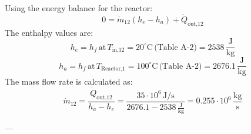 Using the energy balance for the reactor:  
\[
0 = \dot{m}_{12} (h_e - h_a) + \dot{Q}_{\text{out,12}}
\]  
The enthalpy values are:  
\[
h_e = h_f \, \text{at} \, T_{\text{in,12}} = 20^\circ\text{C} \, \text{(Table A-2)} = 2538 \, \frac{\text{J}}{\text{kg}}
\]  
\[
h_a = h_f \, \text{at} \, T_{\text{Reactor,1}} = 100^\circ\text{C} \, \text{(Table A-2)} = 2676.1 \, \frac{\text{J}}{\text{kg}}
\]  
The mass flow rate is calculated as:  
\[
\dot{m}_{12} = \frac{\dot{Q}_{\text{out,12}}}{h_a - h_e} = \frac{35 \cdot 10^6 \, \text{J/s}}{2676.1 - 2538 \, \frac{\text{J}}{\text{kg}}} = 0.255 \cdot 10^6 \, \frac{\text{kg}}{\text{s}}
\]  

---